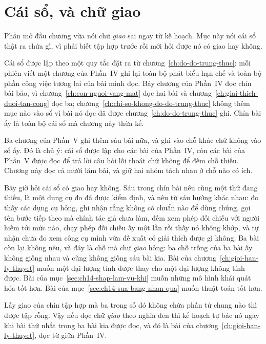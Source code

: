 \section{Cái sổ, và chữ giao}
\label{sec:ch18-so-va-chu-giao}

%
Phần mở đầu chương vừa nói chữ \emph{giao} sai ngay từ kế hoạch. Mục này nói cái
sổ thật ra chứa gì, vì phải biết tập hợp trước rồi mới hỏi được nó có giao hay
không.

%
Cái sổ được lập theo một quy tắc đặt ra từ chương~\ref{ch:do-do-trung-thuc}: mỗi
phiên viết một chương của Phần~IV ghi lại toàn bộ phát biểu hạn chế và toàn bộ
phần công việc tương lai của bài mình đọc. Bảy chương của Phần~IV đọc chín bài
báo, vì chương~\ref{ch:con-nguoi-vang-mat} đọc hai bài và
chương~\ref{ch:giai-thich-duoi-tan-cong} đọc ba;
chương~\ref{ch:chi-so-khong-do-do-trung-thuc} không thêm mục nào vào sổ vì bài nó
đọc đã được chương~\ref{ch:do-do-trung-thuc} ghi. Chín bài ấy là toàn bộ cái sổ
mà chương này thừa kế.

Ba chương của Phần~V ghi thêm sáu bài nữa, và ghi vào chỗ khác chứ không vào sổ
ấy. Đó là chủ ý: cái sổ được lập cho các bài của Phần~IV, còn các bài của Phần~V được
đọc để trả lời câu hỏi lối thoát chứ không để đếm chỗ thiếu. Chương này đọc cả
mười lăm bài, và giữ hai nhóm tách nhau ở chỗ nào có ích.

%
Bây giờ hỏi cái sổ có giao hay không. Sáu trong chín bài nêu cùng một thứ đang
thiếu, là một dụng cụ đo  đã được kiểm định, và
nêu từ sáu hướng
khác nhau: đo thấy các dụng cụ hỏng, ghi nhận rằng không có chuẩn nào để dùng
chúng, gọi tên bước tiếp theo mà chính tác giả chưa làm, đếm xem phép đối chiếu
với người hiếm tới mức nào, chạy phép đối chiếu ấy một lần rồi thấy nó không
khớp, và tự nhận chưa đo xem công cụ mình vừa đề xuất có giải thích được gì
không. Ba bài còn lại không nêu, và đây là chỗ mà chữ \emph{giao} hỏng: ba chỗ
trống của ba bài ấy không giống nhau và cũng không giống sáu bài kia. Bài của
chương~\ref{ch:gioi-han-ly-thuyet} muốn một đại lượng tính được thay cho một đại
lượng không tính được. Bài của mục~\ref{sec:ch14-shap-lam-vu-khi} muốn những mô
hình khái quát hóa tốt hơn. Bài của mục~\ref{sec:ch14-sua-bang-nhan-qua} muốn
thuật toán  tốt hơn.

Lấy giao của chín tập hợp mà ba trong số đó không chứa phần tử chung nào thì được
tập rỗng. Vậy nếu đọc chữ \emph{giao} theo nghĩa đen thì kế hoạch tự bác nó ngay
khi bài thứ nhất trong ba bài kia được đọc, và đó là bài của
chương~\ref{ch:gioi-han-ly-thuyet}, đọc từ giữa Phần~IV.

